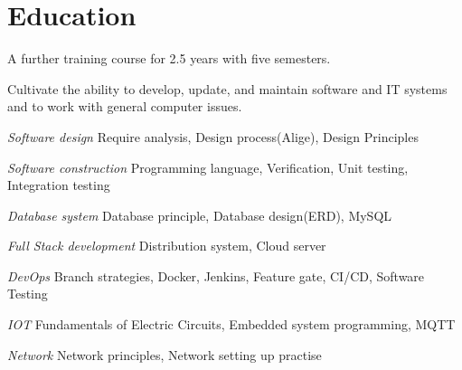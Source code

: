 \section{Education}

\begin{resume_list}
\item A further training course for 2.5 years with five semesters. 
\item Cultivate the ability to develop, update, and maintain software and IT systems and to work with general computer issues.
\end{resume_list}

\begin{resume_list}
	\item {\it Software design} {\hfill Require analysis, Design process(Alige), Design Principles}
	\item {\it Software construction}  {\hfill Programming language, Verification, Unit testing, Integration testing}
	\item {\it Database system} {\hfill Database principle, Database design(ERD), MySQL}
	\item {\it Full Stack development} {\hfill Distribution system, Cloud server}
	\item {\it DevOps} {\hfill Branch strategies, Docker, Jenkins, Feature gate, CI/CD, Software Testing}
	\item {\it IOT} {\hfill Fundamentals of Electric Circuits, Embedded system programming, MQTT}
	\item {\it Network} {\hfill Network principles, Network setting up practise}
\end{resume_list}
